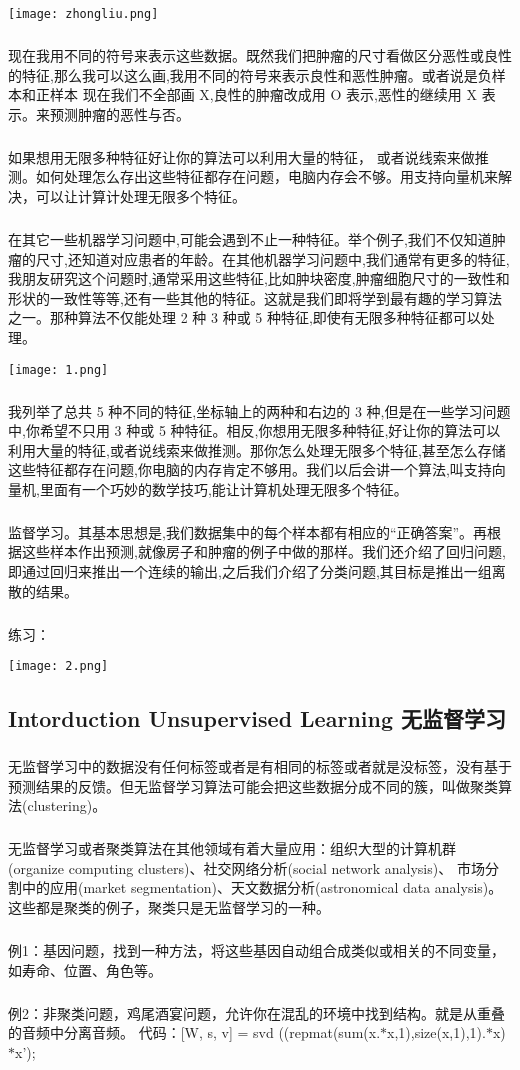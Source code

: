 \documentclass{article}
\begin{document}
\begin{CJK}{UTF8}{gbsn}
\texttt{[image: zhongliu.png]}
\subparagraph*{}
现在我用不同的符号来表示这些数据。既然我们把肿瘤的尺寸看做区分恶性或良性的特征,那么我可以这么画,我用不同的符号来表示良性和恶性肿瘤。或者说是负样本和正样本
现在我们不全部画 X,良性的肿瘤改成用 O 表示,恶性的继续用 X 表示。来预测肿瘤的恶性与否。
\subparagraph*{}
如果想用无限多种特征好让你的算法可以利用大量的特征，
或者说线索来做推测。如何处理怎么存出这些特征都存在问题，电脑内存会不够。用支持向量机来解决，可以让计算计处理无限多个特征。
\subparagraph*{}
在其它一些机器学习问题中,可能会遇到不止一种特征。举个例子,我们不仅知道肿瘤的尺寸,还知道对应患者的年龄。在其他机器学习问题中,我们通常有更多的特征,我朋友研究这个问题时,通常采用这些特征,比如肿块密度,肿瘤细胞尺寸的一致性和形状的一致性等等,还有一些其他的特征。这就是我们即将学到最有趣的学习算法之一。那种算法不仅能处理 2 种 3 种或 5 种特征,即使有无限多种特征都可以处理。

\texttt{[image: 1.png]}
\subparagraph*{}
我列举了总共 5 种不同的特征,坐标轴上的两种和右边的 3 种,但是在一些学习问题中,你希望不只用 3 种或 5 种特征。相反,你想用无限多种特征,好让你的算法可以
利用大量的特征,或者说线索来做推测。那你怎么处理无限多个特征,甚至怎么存储这些特征都存在问题,你电脑的内存肯定不够用。我们以后会讲一个算法,叫支持向量机,里面有一个巧妙的数学技巧,能让计算机处理无限多个特征。
\subparagraph*{}
监督学习。其基本思想是,我们数据集中的每个样本都有相应的“正确答案”。再根据这些样本作出预测,就像房子和肿瘤的例子中做的那样。我们还介绍了回归问题,即通过回归来推出一个连续的输出,之后我们介绍了分类问题,其目标是推出一组离散的结果。
\subparagraph*{}
练习：

\texttt{[image: 2.png]}
\subsection{Intorduction Unsupervised Learning 无监督学习}
\subparagraph*{}
无监督学习中的数据没有任何标签或者是有相同的标签或者就是没标签，没有基于预测结果的反馈。但无监督学习算法可能会把这些数据分成不同的簇，叫做聚类算法(clustering)。
\subparagraph*{}
无监督学习或者聚类算法在其他领域有着大量应用：组织大型的计算机群(organize computing clusters)、社交网络分析(social network analysis)、
市场分割中的应用(market segmentation)、天文数据分析(astronomical data analysis)。这些都是聚类的例子，聚类只是无监督学习的一种。
\subparagraph*{}
例1：基因问题，找到一种方法，将这些基因自动组合成类似或相关的不同变量，如寿命、位置、角色等。
\subparagraph*{}
例2：非聚类问题，鸡尾酒宴问题，允许你在混乱的环境中找到结构。就是从重叠的音频中分离音频。
代码：[W, s, v] = svd ((repmat(sum(x.$*$x,1),size(x,1),1).$*$x)$*$x');
\end{CJK}
\end{document}
